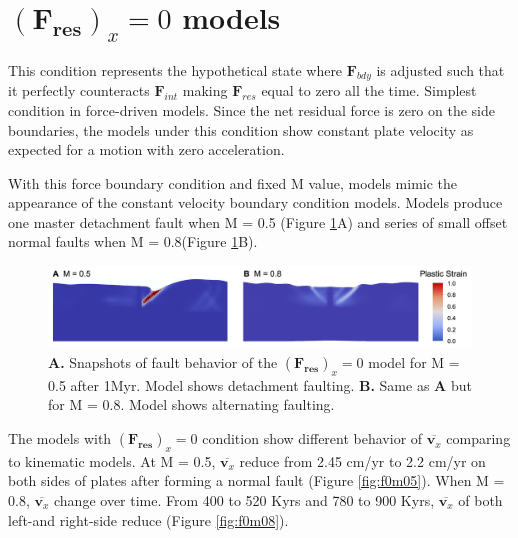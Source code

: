 \documentclass[letterpaper,12pt,notitle]{memphisthesis}                     %
\begin{document}
\section{$(\boldsymbol{F_{res}})_x=0$ models}

This condition represents the hypothetical state where $\boldsymbol{F}_{bdy}$ is adjusted such that it perfectly counteracts $\boldsymbol{F}_{int}$ making $\boldsymbol{F}_{res}$ equal to zero all the time. Simplest condition in force-driven models. Since the net residual force is zero on the side boundaries, the models under this condition show constant plate velocity as expected for a motion with zero acceleration.

With this force boundary condition and fixed M value, models mimic the appearance of the constant velocity boundary condition models. %
Models produce one master detachment fault when M = 0.5 (Figure \ref{fig:f0fault}A) and series of small offset normal faults when M = 0.8(Figure \ref{fig:f0fault}B).
%
\begin{figure}[!htb]
	\centering
	\includegraphics[width=0.99\linewidth]{./figs/f0fault.png}
	\caption{\textbf{A.} Snapshots of fault behavior of the $(\boldsymbol{F_{res}})_x=0$ model for M = 0.5 after 1Myr. Model shows detachment faulting. \textbf{B.} Same as \textbf{A} but for M = 0.8. Model shows alternating faulting.}
	\label{fig:f0fault}
\end{figure}

The models with $(\boldsymbol{F_{res}})_x=0$ condition show different behavior of $\overline{\boldsymbol{v}_x}$ comparing to kinematic models. At M = 0.5, $\overline{\boldsymbol{v}_x}$ reduce from 2.45 cm/yr to 2.2 cm/yr on both sides of plates after forming a normal fault (Figure \ref{fig:f0m05}). 
When M = 0.8, $\overline{\boldsymbol{v}_x}$ change over time. From 400 to 520 Kyrs and 780 to 900 Kyrs, $\overline{\boldsymbol{v}_x}$ of both left-and right-side reduce  (Figure \ref{fig:f0m08}).
\end{document}
